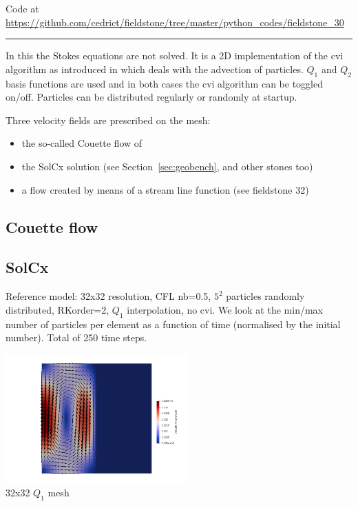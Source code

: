 


\begin{center}
Code at \url{https://github.com/cedrict/fieldstone/tree/master/python_codes/fieldstone_30}
\end{center}

\par\noindent\rule{\textwidth}{0.4pt}

In this the Stokes equations are not solved. It is a 2D implementation of the cvi algorithm 
as introduced in \cite{waav15} which deals with the advection of particles. 
$Q_1$ and $Q_2$ basis functions are used and in both cases the cvi algorithm can be toggled on/off. 
Particles can be distributed regularly or randomly at startup.

Three velocity fields are prescribed on the mesh:
\begin{itemize}
\item the so-called Couette flow of \cite{waav15} 
\item the SolCx solution (see Section~\ref{sec:geobench}, and  other stones too)
\item a flow created by means of a stream line function (see fieldstone 32)
\end{itemize}

\subsection*{Couette flow}


\newpage
\subsection*{SolCx}

Reference model: 32x32 resolution, CFL nb=0.5, $5^2$ particles randomly distributed, RKorder=2,
$Q_1$ interpolation, no cvi.
We look at the min/max number of particles per element as a function of time (normalised 
by the initial number). Total of 250 time steps.

\begin{center}
\includegraphics[width=7cm]{python_codes/fieldstone_30/results_solcx/vel}\\
{\captionfont 32x32 $Q_1$ mesh}
\end{center}

